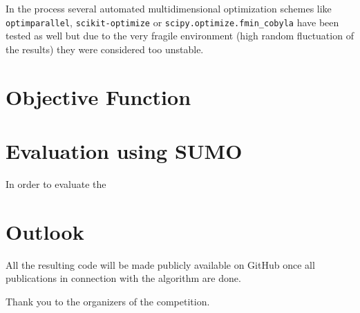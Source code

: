 \documentclass[sigconf,authordraft]{acmart}
\begin{document}
In the process several automated multidimensional optimization schemes like \texttt{optimparallel},
\texttt{scikit-optimize} or \texttt{scipy.optimize.fmin\_cobyla} have been tested as well but due to the
very fragile environment (high random fluctuation of the results) they were considered too unstable.

\section{Objective Function}

\section{Evaluation using SUMO}
In order to evaluate the 


\section{Outlook}
All the resulting code will be made publicly available on GitHub once all publications in connection 
with the algorithm are done.

\begin{acks}
Thank you to the organizers of the competition.
\end{acks}
\end{document}
